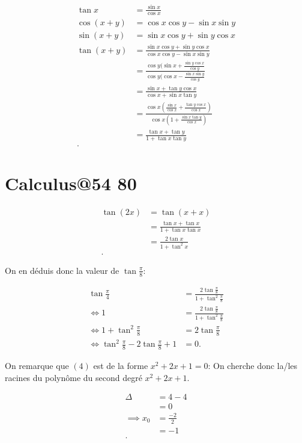 \documentclass{article}
\begin{document}
\begin{align*}
	\tan x &= \frac{\sin x}{\cos x} \\
	\cos (x+y) &= \cos x \cos y - \sin x \sin y \\
	\sin(x+y) &= \sin x \cos y + \sin y \cos x \\
	\tan(x+y) &= \frac{\sin x \cos y + \sin y \cos x}{\cos x \cos y - \sin x \sin y} \\
		  &= \frac{\cos y (\sin x + \frac{\sin y \cos x}{\cos y}}{\cos y (\cos x - \frac{\sin x \sin y}{\cos y}} \\
		  &= \frac{\sin x + \tan y \cos x}{\cos x + \sin x \tan y} \\
		  &= \frac{\cos x \left( \frac{\sin x}{\cos x} + \frac{\tan y \cos x}{\cos x} \right) }{\cos x \left( 1 + \frac{\sin x \tan y}{\cos x} \right) } \\
		  &= \frac{\tan x + \tan y}{1 + \tan x \tan y} \\
.\end{align*}

\section{Calculus@54 80} %
\begin{align*}
	\tan (2x) &= \tan ( x+x) \\
	&= \frac{\tan x + \tan x}{1+\tan x \tan x} \\
	&= \frac{2\tan x}{1+\tan^2x} \\
.\end{align*}

On en déduis donc la valeur de $\tan\frac{\pi}{8}$:

\begin{align}
	\tan \frac{\pi}{4} &= \frac{2\tan\frac{\pi}{8}}{1+\tan^2\frac{\pi}{8}} \\
	\iff 1 &= \frac{2\tan\frac{\pi}{8}}{1+\tan^2 \frac{\pi}{8}} \\
	\iff 1+\tan^2 \frac{\pi}{8} &= 2\tan\frac{\pi}{8} \\
	\iff \tan^2 \frac{\pi}{8} - 2\tan\frac{\pi}{8} +1 &= 0
.\end{align}

On remarque que $(4)$ est de la forme $x^2+2x+1=0$: On cherche donc la/les racines du polynôme du second degré $x^2+2x+1$.

\begin{align*}
	\Delta &= 4 - 4 \\
	       &= 0 \\
	       \implies x_0 &= \frac{-2}{2} \\
	       &= -1 \\
.\end{align*}
\end{document}
